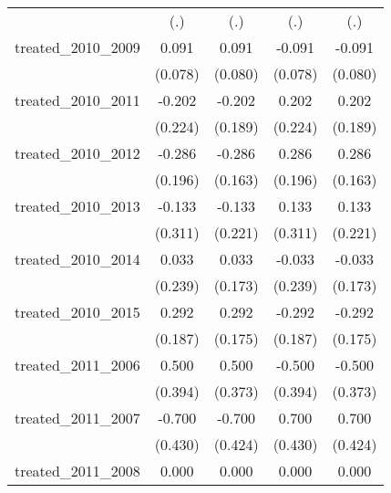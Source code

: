 {\begin{tabular}{l*{4}{c}}
            &         (.)         &         (.)         &         (.)         &         (.)         \\
[1em]
treated\_2010\_2009&       0.091         &       0.091         &      -0.091         &      -0.091         \\
            &     (0.078)         &     (0.080)         &     (0.078)         &     (0.080)         \\
[1em]
treated\_2010\_2011&      -0.202         &      -0.202         &       0.202         &       0.202         \\
            &     (0.224)         &     (0.189)         &     (0.224)         &     (0.189)         \\
[1em]
treated\_2010\_2012&      -0.286         &      -0.286         &       0.286         &       0.286         \\
            &     (0.196)         &     (0.163)         &     (0.196)         &     (0.163)         \\
[1em]
treated\_2010\_2013&      -0.133         &      -0.133         &       0.133         &       0.133         \\
            &     (0.311)         &     (0.221)         &     (0.311)         &     (0.221)         \\
[1em]
treated\_2010\_2014&       0.033         &       0.033         &      -0.033         &      -0.033         \\
            &     (0.239)         &     (0.173)         &     (0.239)         &     (0.173)         \\
[1em]
treated\_2010\_2015&       0.292         &       0.292         &      -0.292         &      -0.292         \\
            &     (0.187)         &     (0.175)         &     (0.187)         &     (0.175)         \\
[1em]
treated\_2011\_2006&       0.500         &       0.500         &      -0.500         &      -0.500         \\
            &     (0.394)         &     (0.373)         &     (0.394)         &     (0.373)         \\
[1em]
treated\_2011\_2007&      -0.700         &      -0.700         &       0.700         &       0.700         \\
            &     (0.430)         &     (0.424)         &     (0.430)         &     (0.424)         \\
[1em]
treated\_2011\_2008&       0.000         &       0.000         &       0.000         &       0.000         \\

\end{tabular}}
